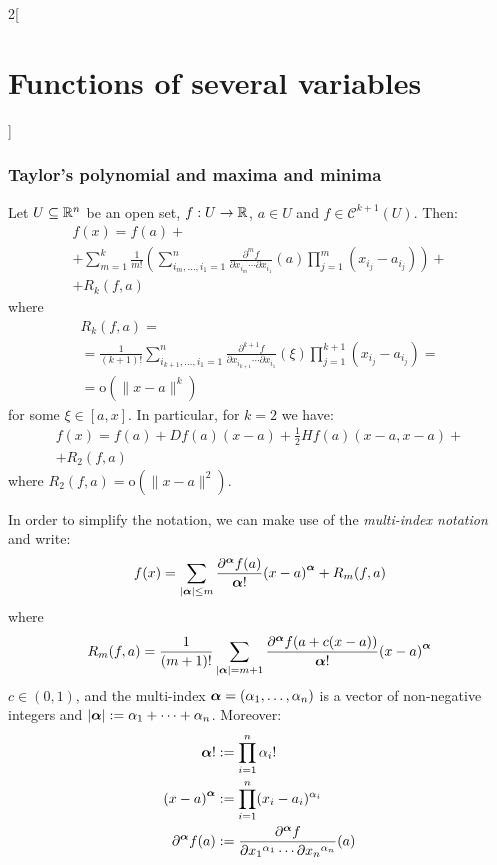 \documentclass[../../../main_math.tex]{subfiles}
\begin{document}
\begin{multicols}{2}[\section{Functions of several variables}]
  \subsubsection{Taylor's polynomial and maxima and minima}
  \begin{theorem}\label{FSV:taylor}
    Let $U\subseteq\mathbb{R}^n$ be an open set, $f:U\rightarrow\mathbb{R} $, $a\in U$ and $f\in \mathcal{C}^{k+1}(U)$. Then:
    \begin{multline*}
      f(x)=f(a)+\\+\sum_{m=1}^k\frac{1}{m!}\left(\sum_{i_m,\ldots,i_1=1}^n\frac{\partial^mf}{\partial x_{i_m}\cdots\partial x_{i_1}}(a)\prod_{j=1}^m(x_{i_j}-a_{i_j})\right)+\\+R_k(f,a)
    \end{multline*} where
    \begin{multline*}
      R_k(f,a)=\\=\frac{1}{(k+1)!}\sum_{i_{k+1},\ldots,i_1=1}^n\frac{\partial^{k+1}f}{\partial x_{i_{k+1}}\cdots\partial x_{i_1}}(\xi)\prod_{j=1}^{k+1}(x_{i_j}-a_{i_j})=\\=\text{o}(\|x-a\|^k)
    \end{multline*} for some $\xi\in[a,x]$. In particular, for $k=2$ we have:
    \begin{multline*}
      f(x)=f(a)+Df(a)(x-a)+\frac{1}{2}Hf(a)(x-a,x-a)+\\+R_2(f,a)
    \end{multline*} where $R_2(f,a)=\text{o}(\|x-a\|^2)$.
  \end{theorem}
  \begin{remark}
    In order to simplify the notation, we can make use of the \emph{multi-index notation} and write:
    $$
      f(x)=\sum_{\abs{\boldsymbol{\mathrm{\alpha}}}\leq m}\frac{\partial^{\boldsymbol{\mathrm{\alpha}}}f(a)}{\boldsymbol{\mathrm{\alpha}}!}{(x-a)}^{\boldsymbol{\mathrm{\alpha}}}+ R_m(f,a)
    $$
    where $$
      R_m(f,a) = \frac{1}{(m+1)!}\sum_{\abs{\boldsymbol{\mathrm{\alpha}}}=m+1}\frac{\partial^{\boldsymbol{\mathrm{\alpha}}}f(a+c(x-a))}{\boldsymbol{\mathrm{\alpha}}!}{(x-a)}^{\boldsymbol{\mathrm{\alpha}}}
    $$
    $c\in (0,1)$, and the multi-index $\boldsymbol{\mathrm{\alpha}}=(\alpha_1,\ldots,\alpha_n)$ is a vector of non-negative integers and $\abs{\boldsymbol{\mathrm{\alpha}}}:=\alpha_1+\cdots+\alpha_n$. Moreover:
    \begin{align*}
      \vf\alpha!               & :=\prod_{i=1}^n\alpha_i!                                                                    \\
      {(x-a)}^{\vf\alpha}      & :=\prod_{i=1}^n(x_{i}-a_{i})^{\alpha_i}                                                     \\
      \partial^{\vf\alpha}f(a) & :=\frac{\partial^{\vf\alpha}f}{\partial {x_1}^{\alpha_1}\cdots\partial {x_n}^{\alpha_n}}(a)

\end{align*}
\end{remark}
\end{multicols}
\end{document}

